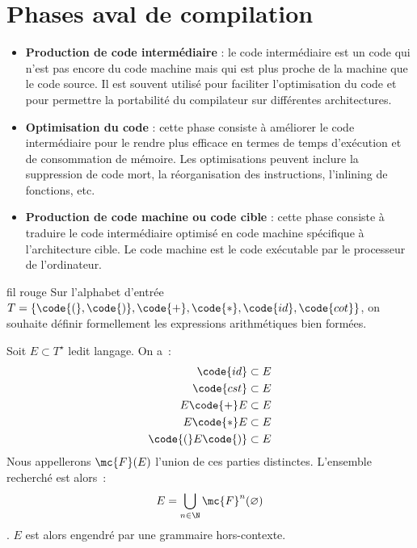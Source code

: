 \section{Phases aval de compilation}
\begin{itemize}
  \item \textbf{Production de code intermédiaire} : le code intermédiaire est un code qui n'est pas encore du code machine mais qui est plus proche de la machine que le code source. Il est souvent utilisé pour faciliter l'optimisation du code et pour permettre la portabilité du compilateur sur différentes architectures.
  \item \textbf{Optimisation du code} : cette phase consiste à améliorer le code intermédiaire pour le rendre plus efficace en termes de temps d'exécution et de consommation de mémoire. Les optimisations peuvent inclure la suppression de code mort, la réorganisation des instructions, l'inlining de fonctions, etc.
  \item \textbf{Production de code machine ou code cible} : cette phase consiste à traduire le code intermédiaire optimisé en code machine spécifique à l'architecture cible. Le code machine est le code exécutable par le processeur de l'ordinateur.
\end{itemize}

\begin{exemple}{}{fil rouge}
Sur l'alphabet d'entrée $T = \{\code{(}, \code{)}, \code{+}, \code{*}, \code{id}, \code{cot}\}$, on souhaite définir formellement les expressions arithmétiques bien formées. \par
Soit $E \subset T^\star$ ledit langage. On a~:
\begin{align*}
  \code{id} &\subset E\\ 
  \code{cst} &\subset E\\
  E \code{+} E &\subset E\\
  E \code{*} E &\subset E\\
  \code{(} E \code{)} &\subset E\\
\end{align*}
Nous appellerons $\mc{F}(E)$ l'union de ces parties distinctes. L'ensemble recherché est alors~:
$$E = \bigcup_{n \in \N}\mc{F}^n(\varnothing)$$.
$E$ est alors engendré par une grammaire hors-contexte.



\end{exemple}
